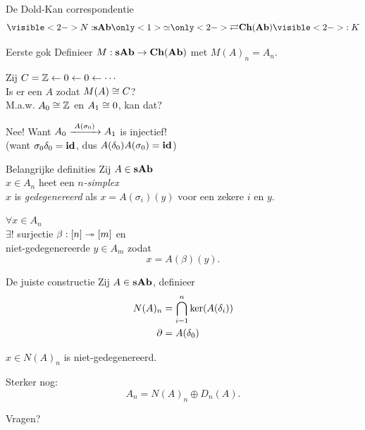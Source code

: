 \documentclass[14pt]{beamer}
\newcommand{\from}{\leftarrow}
\begin{document}
\begin{frame}{De Dold-Kan correspondentie}
	$$ \visible<2->{N:} \sAb \only<1>{\simeq} \only<2->{\rightleftarrows} \Ch{\Ab} \visible<2->{:K} $$
	

	\bigskip{}
\end{frame}

\begin{frame}{Eerste gok}
	Definieer $M: \mathbf{sAb} \to \mathbf{Ch}(\mathbf{Ab})$ met $M(A)_n = A_n$.

	\bigskip\pause
	Zij $C = \Z \from 0 \from 0 \from \cdots$\\
	Is er een $A$ zodat $M(A) \cong C$?\\
	M.a.w. $A_0 \cong \mathbb{Z}$ en $A_1 \cong 0$, kan dat?

	\bigskip\pause
	Nee! Want $A_0 \xrightarrow{\,\,{A(\sigma_0)}\,\,} A_1$ is injectief!\\
	(want $\sigma_0 \delta_0 = \mathbf{id}$, dus $A(\delta_0)A(\sigma_0) = \mathbf{id}$)
\end{frame}

\begin{frame}{Belangrijke definities}
	Zij $A \in \mathbf{sAb}$ \\
	$x \in A_n$ heet een \emph{$n$-simplex} \\
	$x$ is \emph{gedegenereerd} als $x = A(\sigma_i)(y)$ voor een zekere $i$ en $y$.

	\bigskip\pause
	\begin{lemma}
		$\forall x \in A_n$ \\
		$\exists !$ surjectie $\beta: [n] \twoheadrightarrow [m]$ en\\
		niet-gedegenereerde $y \in A_m$ zodat
		$$ x = A(\beta)(y). $$
	\end{lemma}
\end{frame}

\begin{frame}{De juiste constructie}
	Zij $A \in \mathbf{sAb}$, definieer
	\begin{align*}
		N(A)_n &= \bigcap_{i=1}^n \ker(A(\delta_i)) \\
		\partial &= A(\delta_0)
	\end{align*}

	\bigskip\pause
	\begin{lemma}
		$x \in N(A)_n$ is niet-gedegenereerd.
	\end{lemma}
	\bigskip
	\begin{lemma}
		Sterker nog:
		$$ A_n = N(A)_n \oplus D_n(A). $$
	\end{lemma}
\end{frame}

\begin{frame}
	\begin{center}
	\Huge Vragen?
	\end{center}
\end{frame}
\end{document}
